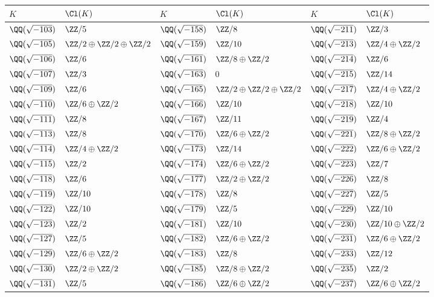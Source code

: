 \begin{center}
\renewcommand{\arraystretch}{1.5}
\begin{tabular}{x{2cm}x{2.5cm}x{2cm}x{2.5cm}x{2cm}x{2.5cm}}
\hline
$K$ & $\Cl (K)$ & $K$ & $\Cl (K)$ & $K$ & $\Cl (K)$ \tabularnewline\hline
$\QQ (\sqrt{-103})$ & $\ZZ/5$ & $\QQ (\sqrt{-158})$ & $\ZZ/8$ & $\QQ (\sqrt{-211})$ & $\ZZ/3$ \tabularnewline\hline
$\QQ (\sqrt{-105})$ & $\ZZ/2\oplus\ZZ/2\oplus\ZZ/2$ & $\QQ (\sqrt{-159})$ & $\ZZ/10$ & $\QQ (\sqrt{-213})$ & $\ZZ/4\oplus\ZZ/2$ \tabularnewline\hline
$\QQ (\sqrt{-106})$ & $\ZZ/6$ & $\QQ (\sqrt{-161})$ & $\ZZ/8\oplus\ZZ/2$ & $\QQ (\sqrt{-214})$ & $\ZZ/6$ \tabularnewline\hline
$\QQ (\sqrt{-107})$ & $\ZZ/3$ & $\QQ (\sqrt{-163})$ & $0$ & $\QQ (\sqrt{-215})$ & $\ZZ/14$ \tabularnewline\hline
$\QQ (\sqrt{-109})$ & $\ZZ/6$ & $\QQ (\sqrt{-165})$ & $\ZZ/2\oplus\ZZ/2\oplus\ZZ/2$ & $\QQ (\sqrt{-217})$ & $\ZZ/4\oplus\ZZ/2$ \tabularnewline\hline
$\QQ (\sqrt{-110})$ & $\ZZ/6\oplus\ZZ/2$ & $\QQ (\sqrt{-166})$ & $\ZZ/10$ & $\QQ (\sqrt{-218})$ & $\ZZ/10$ \tabularnewline\hline
$\QQ (\sqrt{-111})$ & $\ZZ/8$ & $\QQ (\sqrt{-167})$ & $\ZZ/11$ & $\QQ (\sqrt{-219})$ & $\ZZ/4$ \tabularnewline\hline
$\QQ (\sqrt{-113})$ & $\ZZ/8$ & $\QQ (\sqrt{-170})$ & $\ZZ/6\oplus\ZZ/2$ & $\QQ (\sqrt{-221})$ & $\ZZ/8\oplus\ZZ/2$ \tabularnewline\hline
$\QQ (\sqrt{-114})$ & $\ZZ/4\oplus\ZZ/2$ & $\QQ (\sqrt{-173})$ & $\ZZ/14$ & $\QQ (\sqrt{-222})$ & $\ZZ/6\oplus\ZZ/2$ \tabularnewline\hline
$\QQ (\sqrt{-115})$ & $\ZZ/2$ & $\QQ (\sqrt{-174})$ & $\ZZ/6\oplus\ZZ/2$ & $\QQ (\sqrt{-223})$ & $\ZZ/7$ \tabularnewline\hline
$\QQ (\sqrt{-118})$ & $\ZZ/6$ & $\QQ (\sqrt{-177})$ & $\ZZ/2\oplus\ZZ/2$ & $\QQ (\sqrt{-226})$ & $\ZZ/8$ \tabularnewline\hline
$\QQ (\sqrt{-119})$ & $\ZZ/10$ & $\QQ (\sqrt{-178})$ & $\ZZ/8$ & $\QQ (\sqrt{-227})$ & $\ZZ/5$ \tabularnewline\hline
$\QQ (\sqrt{-122})$ & $\ZZ/10$ & $\QQ (\sqrt{-179})$ & $\ZZ/5$ & $\QQ (\sqrt{-229})$ & $\ZZ/10$ \tabularnewline\hline
$\QQ (\sqrt{-123})$ & $\ZZ/2$ & $\QQ (\sqrt{-181})$ & $\ZZ/10$ & $\QQ (\sqrt{-230})$ & $\ZZ/10\oplus\ZZ/2$ \tabularnewline\hline
$\QQ (\sqrt{-127})$ & $\ZZ/5$ & $\QQ (\sqrt{-182})$ & $\ZZ/6\oplus\ZZ/2$ & $\QQ (\sqrt{-231})$ & $\ZZ/6\oplus\ZZ/2$ \tabularnewline\hline
$\QQ (\sqrt{-129})$ & $\ZZ/6\oplus\ZZ/2$ & $\QQ (\sqrt{-183})$ & $\ZZ/8$ & $\QQ (\sqrt{-233})$ & $\ZZ/12$ \tabularnewline\hline
$\QQ (\sqrt{-130})$ & $\ZZ/2\oplus\ZZ/2$ & $\QQ (\sqrt{-185})$ & $\ZZ/8\oplus\ZZ/2$ & $\QQ (\sqrt{-235})$ & $\ZZ/2$ \tabularnewline\hline
$\QQ (\sqrt{-131})$ & $\ZZ/5$ & $\QQ (\sqrt{-186})$ & $\ZZ/6\oplus\ZZ/2$ & $\QQ (\sqrt{-237})$ & $\ZZ/6\oplus\ZZ/2$ \tabularnewline\hline

\end{tabular}
\end{center}
